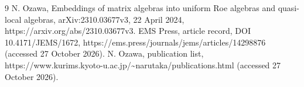 \documentclass[10pt]{article}
\begin{document}
9 N. Ozawa, Embeddings of matrix algebras into uniform Roe algebras and quasi-local algebras, arXiv:2310.03677v3, 22 April 2024, https://arxiv.org/abs/2310.03677v3. EMS Press, article record, DOI 10.4171/JEMS/1672, https://ems.press/journals/jems/articles/14298876 (accessed 27 October 2026). N. Ozawa, publication list, https://www.kurims.kyoto-u.ac.jp/\textasciitilde{}narutaka/publications.html (accessed 27 October 2026).\par
\end{document}
